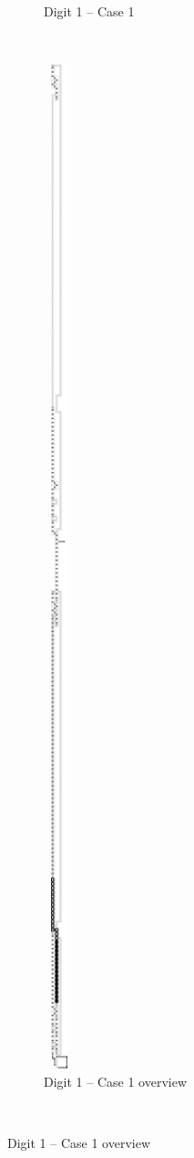 \begin{itemize}
\begin{figure}[H]
\begin{subfigure}[t]{0.33\textwidth}
                \caption{\label{fig:pre_warp_case2_digit1_msr} Digit 1 -- Case 1}
            \end{subfigure}%
            ~
            \begin{subfigure}[t]{0.2\textwidth}
                \centering
                \includegraphics[width=0.1\textwidth]{overviews/case1/pre_warp_1_op_msr_msd}
                \caption{\label{fig:pre_warp_1_op_msr_msd_overview} Digit 1 -- Case 1 overview}
            \end{subfigure}%
            ~
        \end{figure}


\end{itemize}
